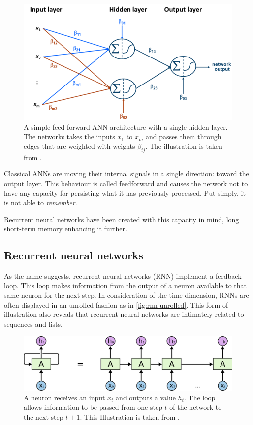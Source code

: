 \begin{figure}
    \centering
    \includegraphics[width=.85\textwidth]{gfx/feedforward-neural-network.png}
    \caption{A simple feed-forward ANN architecture with a single hidden layer. The networks takes the inputs $x_1$ to $x_m$ and passes them through edges that are weighted with weights $\beta_{ij}$. The illustration is taken from \cite{lessmannBADS}.}
    \label{fig:feedforward-ann}
\end{figure}

Classical ANNs are moving their internal signals in a single direction: toward the output layer. This behaviour is called feedforward and causes the network not to have any capacity for persisting what it has previously processed. Put simply, it is not able to \textit{remember}.

Recurrent neural networks have been created with this capacity in mind, long short-term memory enhancing it further.

\subsection{Recurrent neural networks}
As the name suggests, recurrent neural networks (RNN) implement a feedback loop. This loop makes information from the output of a neuron available to that same neuron for the next step. In consideration of the time dimension, RNNs are often displayed in an unrolled fashion as in \autoref{fig:rnn-unrolled}. This form of illustration also reveals that recurrent neural networks are intimately related to sequences and lists.

\begin{figure}
    \centering
    \includegraphics[width=.9\textwidth]{gfx/rnn-unrolled.png}
    \caption{A neuron receives an input $x_t$ and outputs a value $h_t$. The loop allows information to be passed from one step $t$ of the network to the next step $t+1$. This Illustration is taken from \cite{web:colah}.}
    \label{fig:rnn-unrolled}
\end{figure}

